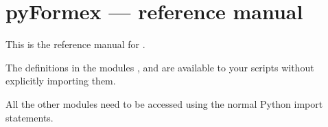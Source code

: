 
\chapter{pyFormex --- reference manual}
\label{cha:reference}

This is the reference manual for \pyformex.


The definitions in the modules ,  and  are available to your \pyformex scripts without explicitly importing them.

All the other modules need to be accessed using the normal Python import statements.








